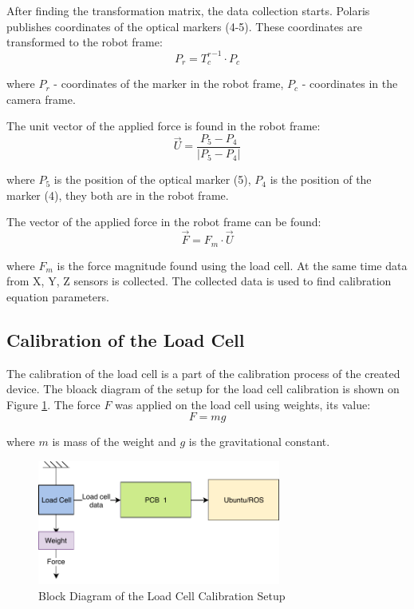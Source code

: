 	After finding the transformation matrix, the data collection starts. Polaris publishes coordinates of the optical markers (4-5). These coordinates are transformed to the robot frame:
\begin{equation}
P_{r} = {T_{c}^{ r}}^{-1} \cdot P_{c}
\end{equation}

	where $P_{r}$ - coordinates of the marker in the robot frame, $P_{c}$ - coordinates in the camera frame.
	
	The unit vector of the applied force is found in the robot frame:
\begin{equation}
\vec{U} = \frac{P_{5} - P_{4}}{|P_{5} - P_{4}|}
\end{equation}
	
	where $P_{5}$ is the position of the optical marker (5), $P_{4}$ is the position of the marker (4), they both are in the robot frame.
	
	The vector of the applied force in the robot frame can be found:
\begin{equation}
\vec{F} = F_{m} \cdot \vec{U}
\end{equation}

	where $F_{m}$ is the force magnitude found using the load cell.
	At the same time data from X, Y, Z sensors is collected. The collected data is used to find calibration equation parameters.
	
	\subsection{Calibration of the Load Cell}
	\label{sec:CalLoadCell}
	The calibration of the load cell is a part of the calibration process of the created device. The bloack diagram of the setup for the load cell calibration is shown on Figure \ref{fig:Calib_setup_LC}. The force $F$ was applied on the load cell using weights, its value: 
\begin{equation}
F = mg
\end{equation}

	where $m$ is mass of the weight and $g$ is the gravitational constant.

\begin{figure}[h]
	\begin{center}
	\includegraphics[width=80mm]{fig/methods/Load_Cell_Calibration.pdf}
	\end{center}
	\vspace{-4mm}
	\caption[Block Diagram of the Load Cell Calibration Setup]
	{Block Diagram of the Load Cell Calibration Setup}
	\label{fig:Calib_setup_LC}
	\vspace{-2mm}
\end{figure}

